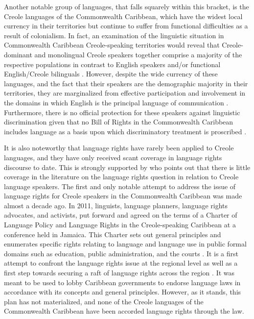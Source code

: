 \documentclass[output=paper,colorlinks,citecolor=brown]{langscibook}
\begin{document}
Another notable group of languages, that falls squarely within this bracket, is the Creole languages of the Commonwealth Caribbean, which have the widest local currency in their territories but continue to suffer from functional difficulties as a result of colonialism. In fact, an examination of the linguistic situation in Commonwealth Caribbean Creole-speaking territories would reveal that Creole-dominant and monolingual Creole speakers together comprise a majority of the respective populations in contrast to English speakers and/or functional English/Creole bilinguals \citep{BrownBlake2014}. However, despite the wide currency of these languages, and the fact that their speakers are the demographic majority in their territories, they are marginalized from effective participation and involvement in the domains in which English is the principal language of communication \citep{BrownBlake2014}. Furthermore, there is no official protection for these speakers against linguistic discrimination given that no Bill of Rights in the Commonwealth Caribbean includes language as a basis upon which discriminatory treatment is proscribed \citep{BrownBlake2008}.

It is also noteworthy that language rights have rarely been applied to Creole languages, and they have only received scant coverage in language rights discourse to date. This is strongly supported by \citet{Eades2010} who points out that there is little coverage in the literature on the language rights question in relation to Creole language speakers. The first and only notable attempt to address the issue of language rights for Creole speakers in the Commonwealth Caribbean was made almost a decade ago. In 2011, linguists, language planners, language rights advocates, and activists, put forward and agreed on the terms of a Charter of Language Policy and Language Rights in the Creole-speaking Caribbean at a conference held in Jamaica. This Charter sets out general principles and enumerates specific rights relating to language and language use in public formal domains such as education, public administration, and the courts \citep{BrownBlake2014}. It is a first attempt to confront the language rights issue at the regional level as well as a first step towards securing a raft of language rights across the region \citep{Brown-Blake2011}. It was meant to be used to lobby Caribbean governments to endorse language laws in accordance with its concepts and general principles. However, as it stands, this plan has not materialized, and none of the Creole languages of the Commonwealth Caribbean have been accorded language rights through the law.  
\end{document}
